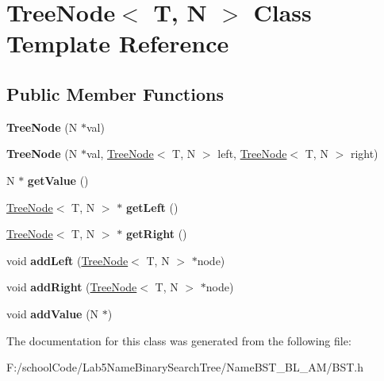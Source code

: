 \hypertarget{class_tree_node}{}\section{Tree\+Node$<$ T, N $>$ Class Template Reference}
\label{class_tree_node}
\subsection*{Public Member Functions}
\begin{DoxyCompactItemize}
\item 
\mbox{\label{class_tree_node_ae4c36a49bc495116eea1aca789683785}} 
{\bfseries Tree\+Node} (N $\ast$val)
\item 
\mbox{\label{class_tree_node_a07af5125bd340cc049a7f3ffed2bb934}} 
{\bfseries Tree\+Node} (N $\ast$val, \hyperlink{class_tree_node}{Tree\+Node}$<$ T, N $>$ left, \hyperlink{class_tree_node}{Tree\+Node}$<$ T, N $>$ right)
\item 
\mbox{\label{class_tree_node_a8dc87560d38bbe101a30a834760a2fb3}} 
N $\ast$ {\bfseries get\+Value} ()
\item 
\mbox{\label{class_tree_node_ae10580e578ff353006e3c6e2db44b568}} 
\hyperlink{class_tree_node}{Tree\+Node}$<$ T, N $>$ $\ast$ {\bfseries get\+Left} ()
\item 
\mbox{\label{class_tree_node_a00d3565d6fd93b80ea1dac1a446c7941}} 
\hyperlink{class_tree_node}{Tree\+Node}$<$ T, N $>$ $\ast$ {\bfseries get\+Right} ()
\item 
\mbox{\label{class_tree_node_a2cdbeb6bca29480c4a485cea6f409e93}} 
void {\bfseries add\+Left} (\hyperlink{class_tree_node}{Tree\+Node}$<$ T, N $>$ $\ast$node)
\item 
\mbox{\label{class_tree_node_a9047f15c81fdba890139453be4b0c43a}} 
void {\bfseries add\+Right} (\hyperlink{class_tree_node}{Tree\+Node}$<$ T, N $>$ $\ast$node)
\item 
\mbox{\label{class_tree_node_a822ab4fffa26483a181b603bda46f00e}} 
void {\bfseries add\+Value} (N $\ast$)
\end{DoxyCompactItemize}


The documentation for this class was generated from the following file\+:\begin{DoxyCompactItemize}
\item 
F\+:/school\+Code/\+Lab5\+Name\+Binary\+Search\+Tree/\+Name\+B\+S\+T\+\_\+\+B\+L\+\_\+\+A\+M/B\+S\+T.\+h\end{DoxyCompactItemize}
